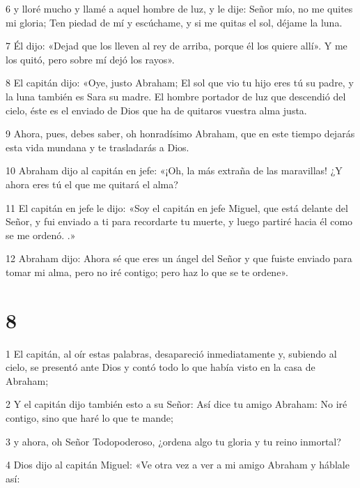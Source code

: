 \par 6 y lloré mucho y llamé a aquel hombre de luz, y le dije: Señor mío, no me quites mi gloria; Ten piedad de mí y escúchame, y si me quitas el sol, déjame la luna.

\par 7 Él dijo: «Dejad que los lleven al rey de arriba, porque él los quiere allí». Y me los quitó, pero sobre mí dejó los rayos».

\par 8 El capitán dijo: «Oye, justo Abraham; El sol que vio tu hijo eres tú su padre, y la luna también es Sara su madre. El hombre portador de luz que descendió del cielo, éste es el enviado de Dios que ha de quitaros vuestra alma justa.

\par 9 Ahora, pues, debes saber, oh honradísimo Abraham, que en este tiempo dejarás esta vida mundana y te trasladarás a Dios.

\par 10 Abraham dijo al capitán en jefe: «¡Oh, la más extraña de las maravillas! ¿Y ahora eres tú el que me quitará el alma?

\par 11 El capitán en jefe le dijo: «Soy el capitán en jefe Miguel, que está delante del Señor, y fui enviado a ti para recordarte tu muerte, y luego partiré hacia él como se me ordenó. .»

\par 12 Abraham dijo: Ahora sé que eres un ángel del Señor y que fuiste enviado para tomar mi alma, pero no iré contigo; pero haz lo que se te ordene».

\chapter{8}

\par 1 El capitán, al oír estas palabras, desapareció inmediatamente y, subiendo al cielo, se presentó ante Dios y contó todo lo que había visto en la casa de Abraham;

\par 2 Y el capitán dijo también esto a su Señor: Así dice tu amigo Abraham: No iré contigo, sino que haré lo que te mande;

\par 3 y ahora, oh Señor Todopoderoso, ¿ordena algo tu gloria y tu reino inmortal?

\par 4 Dios dijo al capitán Miguel: «Ve otra vez a ver a mi amigo Abraham y háblale así:

